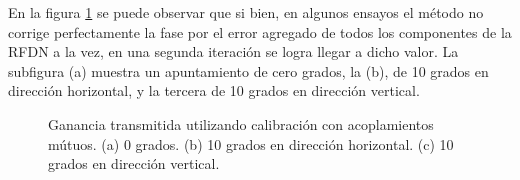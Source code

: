 En la figura \ref{fig:compErrorMutual} se puede observar que si bien, en algunos ensayos el método no corrige 
perfectamente la fase por el error agregado de todos los componentes de la RFDN a la vez, en una segunda iteración se logra 
llegar a dicho valor. La subfigura (a) muestra un apuntamiento de cero grados, la (b), de 10 grados en 
dirección horizontal, y la tercera de 10 grados en dirección vertical.
\begin{figure}[H]
	\centering
 	
		\caption{Ganancia transmitida utilizando calibración con acoplamientos mútuos. (a) 0 grados. (b) 10 grados en 
		dirección horizontal. (c) 10 grados en dirección vertical.}
	\label{fig:compErrorMutual}
\end{figure}
